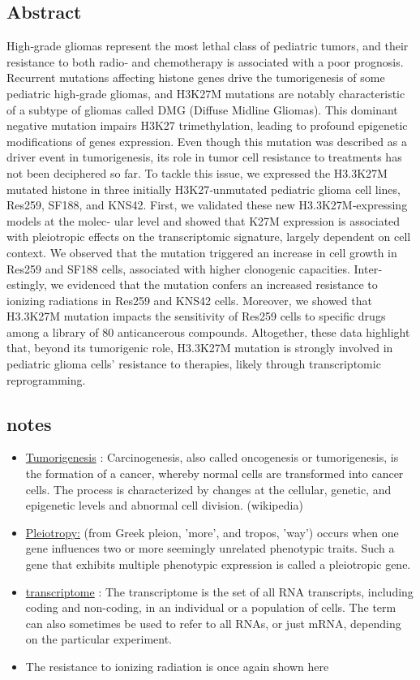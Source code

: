 \documentclass[11pt,a4paper]{article}
\begin{document}
\subsection*{Abstract}
High‐grade gliomas represent the most lethal class of pediatric tumors, and their resistance
to both radio‐ and chemotherapy is associated with a poor prognosis. Recurrent mutations affecting
histone genes drive the tumorigenesis of some pediatric high‐grade gliomas, and H3K27M mutations
are notably characteristic of a subtype of gliomas called DMG (Diffuse Midline Gliomas). This dominant negative mutation impairs H3K27 trimethylation, leading to profound epigenetic modifications
of genes expression. Even though this mutation was described as a driver event in tumorigenesis, its
role in tumor cell resistance to treatments has not been deciphered so far. To tackle this issue, we expressed the H3.3K27M mutated histone in three initially H3K27‐unmutated pediatric glioma cell lines,
Res259, SF188, and KNS42. First, we validated these new H3.3K27M‐expressing models at the molec‐
ular level and showed that K27M expression is associated with pleiotropic effects on the transcriptomic signature, largely dependent on cell context. We observed that the mutation triggered an
increase in cell growth in Res259 and SF188 cells, associated with higher clonogenic capacities. Inter‐
estingly, we evidenced that the mutation confers an increased resistance to ionizing radiations in
Res259 and KNS42 cells. Moreover, we showed that H3.3K27M mutation impacts the sensitivity of
Res259 cells to specific drugs among a library of 80 anticancerous compounds. Altogether, these data highlight that, beyond its tumorigenic role, H3.3K27M mutation is strongly involved in pediatric glioma cells’ resistance to therapies, likely through transcriptomic reprogramming.

\subsection*{notes}
\begin{itemize}
\item  \underline{Tumorigenesis} : Carcinogenesis, also called oncogenesis or tumorigenesis, is the formation of a cancer, whereby normal cells are transformed into cancer cells. The process is characterized by changes at the cellular, genetic, and epigenetic levels and abnormal cell division. (wikipedia)
\item \underline{Pleiotropy:} (from Greek pleion, 'more', and tropos, 'way') occurs when one gene influences two or more seemingly unrelated phenotypic traits. Such a gene that exhibits multiple phenotypic expression is called a pleiotropic gene.
\item \underline{transcriptome} : The transcriptome is the set of all RNA transcripts, including coding and non-coding, in an individual or a population of cells. The term can also sometimes be used to refer to all RNAs, or just mRNA, depending on the particular experiment.
\item The resistance to ionizing radiation is once again shown here
\end{itemize}
\end{document}
